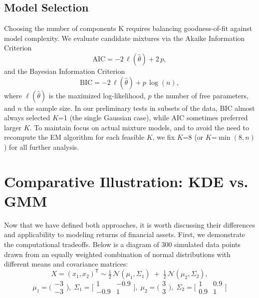 \subsection{Model Selection}
\label{sec:gmmselect}
Choosing the number of components K requires balancing goodness-of-fit against model complexity. We evaluate candidate mixtures via the Akaike Information Criterion
$$\mathrm{AIC} = -2\,\ell(\hat\theta) + 2\,p,$$
and the Bayesian Information Criterion
$$\mathrm{BIC} = -2\,\ell(\hat\theta) + p\,\log(n),$$
where $\ell(\hat\theta)$ is the maximized log-likelihood, $p$ the number of free parameters, and $n$ the sample size. In our preliminary tests in subsets of the data, BIC almost always selected $K$=1 (the single Gaussian case), while AIC sometimes preferred larger $K$. To maintain focus on actual mixture models, and to avoid the need to recompute the EM algorithm for each feasible $K$, we fix $K$=8 (or $K$=$\min(8,n)$) for all further analysis.

\section{Comparative Illustration: KDE vs. GMM}
\label{sec:compare}
Now that we have defined both approaches, it is worth discussing their differences and applicability to modeling returns of financial assets. First, we demonstrate the computational tradeoffs. Below is a diagram of 300 simulated data points drawn from an equally weighted combination of normal distributions with different means and covariance matrices:
$$
X=(x_1,x_2)^\mathsf{T} \sim \tfrac12\,\mathcal N(\mu_1,\Sigma_1)\;+\;\tfrac12\,\mathcal N(\mu_2,\Sigma_2),
$$
$$\mu_1 = \bigl(\!\begin{smallmatrix}-3\\-3\end{smallmatrix}\!\bigr),\;\Sigma_1 = \bigl[\!\begin{smallmatrix}1 & -0.9\\-0.9 & 1\end{smallmatrix}\!\bigr],\;\mu_2 = \bigl(\!\begin{smallmatrix}3\\3\end{smallmatrix}\!\bigr),\;\Sigma_2 = \bigl[\!\begin{smallmatrix}1 & 0.9\\0.9 & 1\end{smallmatrix}\!\bigr]$$


